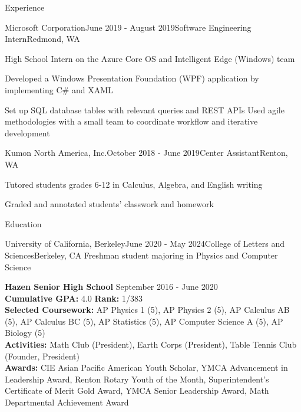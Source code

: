 \documentclass{resume} %
\begin{document}

\begin{rSection}{Experience}

\begin{rSubsection}{Microsoft Corporation}{June 2019 - August 2019}{Software Engineering Intern}{Redmond, WA}
\item High School Intern on the Azure Core OS and Intelligent Edge (Windows) team
\item Developed a Windows Presentation Foundation (WPF) application by implementing C\# and XAML
\item Set up SQL database tables with relevant queries and REST APIs
Used agile methodologies with a small team to coordinate workflow and iterative development
\end{rSubsection}


\begin{rSubsection}{Kumon North America, Inc.}{October 2018 - June 2019}{Center Assistant}{Renton, WA}
\item Tutored students grades 6-12 in Calculus, Algebra, and English writing
\item Graded and annotated students' classwork and homework
\end{rSubsection}

\end{rSection}


\begin{rSection}{Education}
    \begin{rSubsection}{University of California, Berkeley}{June 2020 - May 2024}{College of Letters and Sciences}{Berkeley, CA}
        Freshman student majoring in Physics and Computer Science
        \end{rSubsection}

{\bf Hazen Senior High School} \hfill {September 2016 - June 2020}\\
{\bf Cumulative GPA:} 4.0 {\bf Rank:} 1/383 \smallskip \\
{\bf Selected Coursework:} AP Physics 1 (5), AP Physics 2 (5), AP Calculus AB (5), AP Calculus BC (5), AP Statistics (5), AP Computer Science A (5), AP Biology (5)\\
{\bf Activities:} Math Club (President), Earth Corps (President), Table Tennis Club (Founder, President)\\
{\bf Awards:} CIE Asian Pacific American Youth Scholar, YMCA Advancement in Leadership Award,  Renton Rotary Youth of the Month, Superintendent's Certificate of Merit Gold Award, YMCA Senior Leadership Award, Math Departmental Achievement Award

\end{rSection}
\end{document}
